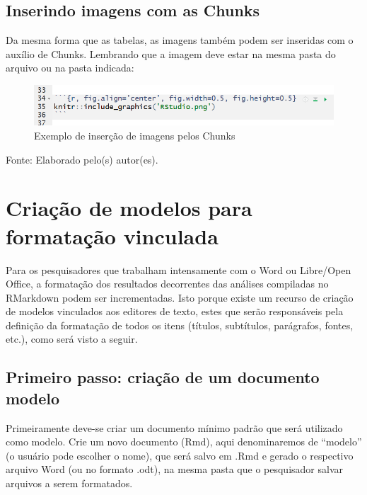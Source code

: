 \documentclass[12pt,brazil,oneside]{book}
\begin{document}
\hypertarget{inserindo-imagens-com-as-chunks}{%
\subsection{Inserindo imagens com as
Chunks}\label{inserindo-imagens-com-as-chunks}}

Da mesma forma que as tabelas, as imagens também podem ser inseridas com
o auxílio de Chunks. Lembrando que a imagem deve estar na mesma pasta do
arquivo ou na pasta indicada:

\begin{figure}[H]

{\centering \includegraphics[width=0.6\linewidth]{rmarkchunkimg} 

}

\caption{Exemplo de inserção de imagens pelos Chunks}\label{fig:rmarkchunk333}
\end{figure}

Fonte: Elaborado pelo(s) autor(es).

\hypertarget{criacao-de-modelos-para-formatacao-vinculada}{%
\section{Criação de modelos para formatação
vinculada}\label{criacao-de-modelos-para-formatacao-vinculada}}

Para os pesquisadores que trabalham intensamente com o Word ou
Libre/Open Office, a formatação dos resultados decorrentes das análises
compiladas no RMarkdown podem ser incrementadas. Isto porque existe um
recurso de criação de modelos vinculados aos editores de texto, estes
que serão responsáveis pela definição da formatação de todos os itens
(títulos, subtítulos, parágrafos, fontes, etc.), como será visto a
seguir.

\hypertarget{primeiro-passo-criacao-de-um-documento-modelo}{%
\subsection{Primeiro passo: criação de um documento
modelo}\label{primeiro-passo-criacao-de-um-documento-modelo}}

Primeiramente deve-se criar um documento mínimo padrão que será
utilizado como modelo. Crie um novo documento (Rmd), aqui denominaremos
de ``modelo'' (o usuário pode escolher o nome), que será salvo em .Rmd e
gerado o respectivo arquivo Word (ou no formato .odt), na mesma pasta
que o pesquisador salvar arquivos a serem formatados.
\end{document}
